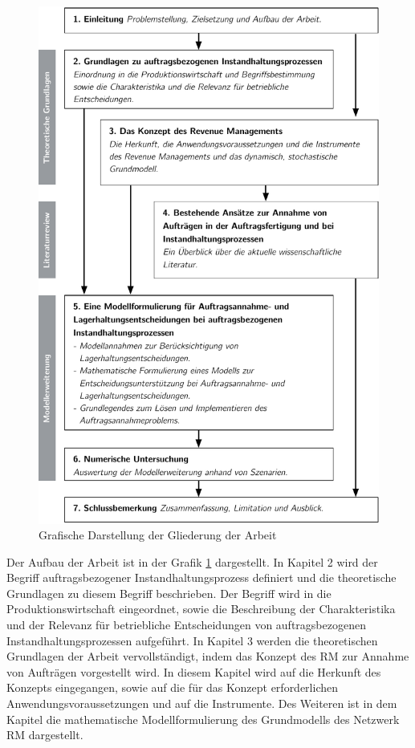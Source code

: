 \begin{figure}[h!]
  \begin{center}
    \includegraphics[width=140mm]{Bilder/Gliederung.pdf}
    \caption{Grafische Darstellung der Gliederung der Arbeit}  \label{Gliederung}
  \end{center}
\end{figure}


Der Aufbau der Arbeit ist in der Grafik \ref{Gliederung} dargestellt. In Kapitel 2 wird der Begriff \glqq auftragsbezogener Instandhaltungsprozess{\grqq} definiert und die theoretische Grundlagen zu diesem Begriff beschrieben. Der Begriff wird in die Produktionswirtschaft eingeordnet, sowie die Beschreibung der Charakteristika und der Relevanz für betriebliche Entscheidungen von auftragsbezogenen Instandhaltungsprozessen aufgeführt. In Kapitel 3 werden die theoretischen Grundlagen der Arbeit vervollständigt, indem das Konzept des RM zur Annahme von Aufträgen vorgestellt wird. In diesem Kapitel wird auf die Herkunft des Konzepts eingegangen, sowie auf die für das Konzept erforderlichen Anwendungsvoraussetzungen und auf die Instrumente. Des Weiteren ist in dem Kapitel die mathematische Modellformulierung des Grundmodells des Netzwerk RM dargestellt.

